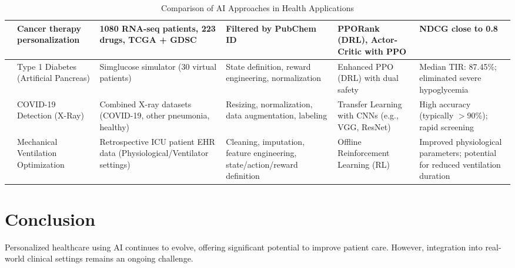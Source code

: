 \documentclass[10pt,a4paper]{article}
\begin{document}
\begin{table}[htbp]
\begin{adjustwidth}{-2cm}{-2cm}
\begin{tabular}{|p{1.5cm}|p{2.5cm}|p{3cm}|p{3.5cm}|p{2.5cm}|p{2.5cm}|}
\hline
\cite{liuDeepReinforcementLearning2022} & Cancer therapy personalization & 1080 RNA-seq patients, 223 drugs, TCGA + GDSC & Filtered by PubChem ID & PPORank (DRL), Actor-Critic with PPO & NDCG close to 0.8 \\
\hline
\cite{zhaoSafeenhancedFullyClosedloop2025} & Type 1 Diabetes (Artificial Pancreas) & Simglucose simulator (30 virtual patients) & State definition, reward engineering, normalization & Enhanced PPO (DRL) with dual safety & Median TIR: 87.45\%; eliminated severe hypoglycemia \\
\hline
\cite{apostolopoulosCovid19AutomaticDetection2020} & COVID-19 Detection (X-Ray) & Combined X-ray datasets (COVID-19, other pneumonia, healthy) & Resizing, normalization, data augmentation, labeling & Transfer Learning with CNNs (e.g., VGG, ResNet) & High accuracy (typically $>$90\%); rapid screening \\
\hline
\cite{liuReinforcementLearningOptimize2024} & Mechanical Ventilation Optimization & Retrospective ICU patient EHR data (Physiological/Ventilator settings) & Cleaning, imputation, feature engineering, state/action/reward definition & Offline Reinforcement Learning (RL) & Improved physiological parameters; potential for reduced ventilation duration \\
\hline

\end{tabular}
\caption{Comparison of AI Approaches in Health Applications}
\label{tab:ai_health_comparison}
\end{adjustwidth}
\end{table}

\section{Conclusion}
Personalized healthcare using AI continues to evolve, offering significant potential to improve patient care. However, integration into real-world clinical settings remains an ongoing challenge.

\newpage


\end{document}
